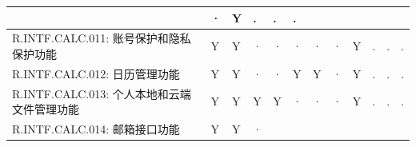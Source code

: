 \begin{table}[htbp]
\begin{tabular}{|p{9em}|p{2em}|p{2em}|p{2em}|p{2em}|p{2em}|
                            p{2em}|p{2em}|p{2em}|p{2em}|p{2em}|p{2em}|}
                & ·                     & Y                 & .
                & .                     & . \\
            \hline %
            R.INTF.CALC.011: 账号保护和隐私保护功能
                & Y                     & Y                 & · 
                & ·                     & ·                 & · 
                & ·                     & Y                 & .
                & .                     & . \\
            \hline %
            R.INTF.CALC.012: 日历管理功能
                & Y                     & Y                 & · 
                & ·                     & Y                 & Y 
                & ·                     & Y                 & .
                & .                     & . \\
            \hline %
            R.INTF.CALC.013: 个人本地和云端文件管理功能
                & Y                     & Y                 & Y 
                & Y                     & ·                 & · 
                & ·                     & Y                 & .
                & .                     & . \\
            \hline %
            R.INTF.CALC.014: 邮箱接口功能
                & Y                     & Y                 & · 

\end{tabular}
\end{table}
